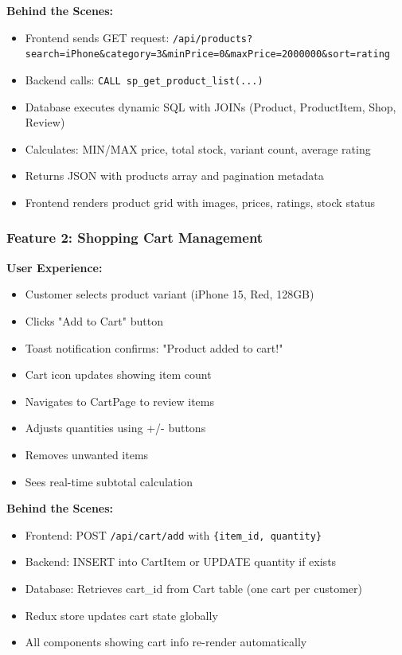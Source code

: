 \textbf{Behind the Scenes:}
\begin{itemize}
    \item Frontend sends GET request: \texttt{/api/products?search=iPhone\&category=3\&minPrice=0\&maxPrice=2000000\&sort=rating}
    \item Backend calls: \texttt{CALL sp\_get\_product\_list(...)}
    \item Database executes dynamic SQL with JOINs (Product, ProductItem, Shop, Review)
    \item Calculates: MIN/MAX price, total stock, variant count, average rating
    \item Returns JSON with products array and pagination metadata
    \item Frontend renders product grid with images, prices, ratings, stock status
\end{itemize}

\subsubsection{Feature 2: Shopping Cart Management}

\textbf{User Experience:}
\begin{itemize}
    \item Customer selects product variant (iPhone 15, Red, 128GB)
    \item Clicks "Add to Cart" button
    \item Toast notification confirms: "Product added to cart!"
    \item Cart icon updates showing item count
    \item Navigates to CartPage to review items
    \item Adjusts quantities using +/- buttons
    \item Removes unwanted items
    \item Sees real-time subtotal calculation
\end{itemize}

\textbf{Behind the Scenes:}
\begin{itemize}
    \item Frontend: POST \texttt{/api/cart/add} with \texttt{\{item\_id, quantity\}}
    \item Backend: INSERT into CartItem or UPDATE quantity if exists
    \item Database: Retrieves cart\_id from Cart table (one cart per customer)
    \item Redux store updates cart state globally
    \item All components showing cart info re-render automatically
\end{itemize}

